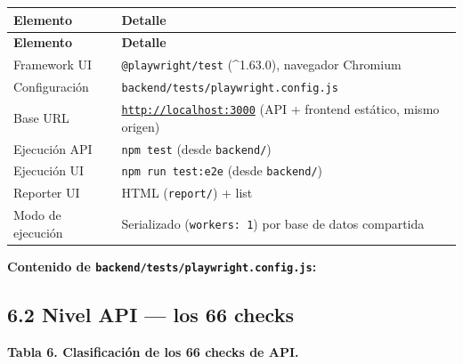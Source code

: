 \documentclass[11pt,a4paper]{article}
\begin{document}
{\small
\begin{longtable}{|p{}|p{}|}
\rowcolor{UTECblue}\color{white}\bfseries Elemento & \color{white}\bfseries Detalle \\ \hline
\endfirsthead
\rowcolor{UTECblue}\color{white}\bfseries Elemento & \color{white}\bfseries Detalle \\ \hline
\endhead
Framework UI & \texttt{@playwright/test} (\textasciicircum{}1.63.0), navegador Chromium \\ \hline
Configuración & \texttt{backend/tests/playwright.config.js} \\ \hline
Base URL & \texttt{\url{http://localhost:3000}} (API + frontend estático, mismo origen) \\ \hline
Ejecución API & \texttt{npm test} (desde \texttt{backend/}) \\ \hline
Ejecución UI & \texttt{npm run test:e2e} (desde \texttt{backend/}) \\ \hline
Reporter UI & HTML (\texttt{report/}) + list \\ \hline
Modo de ejecución & Serializado (\texttt{workers: 1}) por base de datos compartida \\ \hline
\end{longtable}}


\textbf{Contenido de \texttt{backend/tests/playwright.config.js}:}


\subsection*{6.2 Nivel API --- los 66 checks}


\textbf{Tabla 6. Clasificación de los 66 checks de API.}
\end{document}
